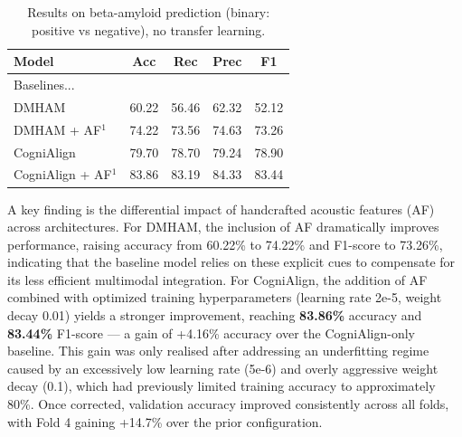 \documentclass{Odyssey2026}
\begin{document}
\begin{table}[h]
    \centering
    \caption{Results on beta-amyloid prediction (binary: positive vs negative), no transfer learning.}
    \begin{tabular}{lcccc}
        \toprule
        \textbf{Model} & \textbf{Acc} & \textbf{Rec} & \textbf{Prec} & \textbf{F1} \\
        \midrule
        Baselines... & & & & \\
        DMHAM           & 60.22 & 56.46 & 62.32 & 52.12 \\
        DMHAM + AF$^1$  & 74.22 & 73.56 & 74.63 & 73.26 \\
        CogniAlign        & 79.70 & 78.70 & 79.24 & 78.90 \\
        CogniAlign + AF$^1$ & 83.86 & 83.19 & 84.33 & 83.44 \\
        \bottomrule
    \end{tabular}
\end{table}

A key finding is the differential impact of handcrafted acoustic features (AF) across architectures. For DMHAM, the inclusion of AF dramatically improves performance, raising accuracy from 60.22\% to 74.22\% and F1-score to 73.26\%, indicating that the baseline model relies on these explicit cues to compensate for its less efficient multimodal integration. For CogniAlign, the addition of AF combined with optimized training hyperparameters (learning rate 2e-5, weight decay 0.01) yields a stronger improvement, reaching \textbf{83.86\%} accuracy and \textbf{83.44\%} F1-score — a gain of +4.16\% accuracy over the CogniAlign-only baseline. This gain was only realised after addressing an underfitting regime caused by an excessively low learning rate (5e-6) and overly aggressive weight decay (0.1), which had previously limited training accuracy to approximately 80\%. Once corrected, validation accuracy improved consistently across all folds, with Fold 4 gaining +14.7\% over the prior configuration.
\end{document}
